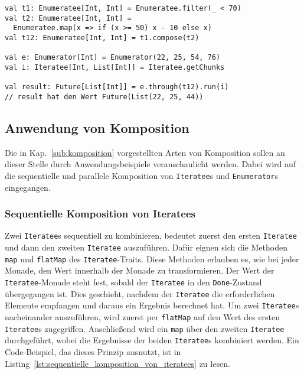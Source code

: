 \begin{lstlisting}[caption=Enumerateeanwendung auf Enumeratees, label=lst:enumerateeanwendung_auf_enumeratees]
val t1: Enumeratee[Int, Int] = Enumeratee.filter(_ < 70)
val t2: Enumeratee[Int, Int] =
  Enumeratee.map(x => if (x >= 50) x - 10 else x)
val t12: Enumeratee[Int, Int] = t1.compose(t2)

val e: Enumerator[Int] = Enumerator(22, 25, 54, 76)
val i: Iteratee[Int, List[Int]] = Iteratee.getChunks

val result: Future[List[Int]] = e.through(t12).run(i)
// result hat den Wert Future(List(22, 25, 44))
\end{lstlisting}




\subsection{Anwendung von Komposition} %
\label{sub:anwendung_komposition}

Die in Kap.~\ref{sub:komposition} vorgestellten Arten von Komposition sollen an dieser Stelle durch Anwendungsbeispiele veranschaulicht werden.
Dabei wird auf die sequentielle und parallele Komposition von \lstinline|Iteratee|s und \lstinline|Enumerator|s eingegangen.

\subsubsection{Sequentielle Komposition von Iteratees} %
\label{ssub:anwendung_sequentielle_komposition_von_iteratees}

Zwei \lstinline|Iteratee|s sequentiell zu kombinieren, bedeutet zuerst den ersten \lstinline|Iteratee| und dann den zweiten \lstinline|Iteratee| auszuführen.
Dafür eignen sich die Methoden \lstinline|map| und \lstinline|flatMap| des \lstinline|Iteratee|-Traits.
Diese Methoden erlauben es, wie bei jeder Monade, den Wert innerhalb der Monade zu transformieren.
Der Wert der \lstinline|Iteratee|-Monade steht fest, sobald der \lstinline|Iteratee| in den \lstinline|Done|-Zustand übergegangen ist.
Dies geschieht, nachdem der \lstinline|Iteratee| die erforderlichen Elemente empfangen und daraus ein Ergebnis berechnet hat.
Um zwei \lstinline|Iteratee|s nacheinander auszuführen, wird zuerst per \lstinline|flatMap| auf den Wert des ersten \lstinline|Iteratee|s zugegriffen.
Anschließend wird ein \lstinline|map| über den zweiten \lstinline|Iteratee| durchgeführt, wobei die Ergebnisse der beiden \lstinline|Iteratee|s kombiniert werden.
Ein Code-Beispiel, das dieses Prinzip ausnutzt, ist in Listing~\ref{lst:sequentielle_komposition_von_iteratees} zu lesen.

